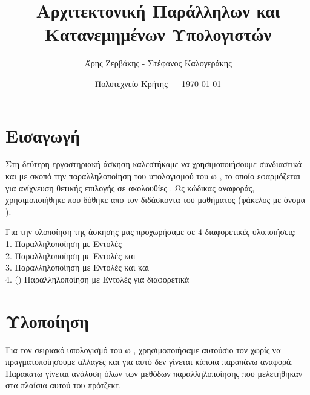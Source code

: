 \documentclass{article}
\title{Αρχιτεκτονική Παράλληλων και Κατανεμημένων Υπολογιστών} %
\author{Άρης Ζερβάκης - Στέφανος Καλογεράκης} %
\date{Πολυτεχνείο Κρήτης --- \today} %
\begin{document}
\maketitle %


\section*{Εισαγωγή} %
Στη δεύτερη εργαστηριακή άσκηση καλεστήκαμε να χρησιμοποιήσουμε συνδιαστικά  και  με σκοπό την παραλληλοποίηση του υπολογισμού του ω , το οποίο εφαρμόζεται για ανίχνευση θετικής επιλογής σε ακολουθίες . Ως κώδικας αναφοράς, χρησιμοποιήθηκε που δόθηκε απο τον διδάσκοντα του μαθήματος (φάκελος με όνομα ).\\
\begin{warn}[] %
	Για την υλοποίηση της άσκησης μας προχωρήσαμε σε 4 διαφορετικές υλοποιήσεις:\\
    1. Παραλληλοποίηση με  Εντολές\\
    2. Παραλληλοποίηση με  Εντολές και \\
    3. Παραλληλοποίηση με  Εντολές και  και \\
    4. () Παραλληλοποίηση με  Εντολές για διαφορετικά 
\end{warn}


\section{Υλοποίηση} %
Για τον σειριακό υπολογισμό του ω , χρησιμοποιήσαμε αυτούσιο τον χωρίς να πραγματοποίησουμε αλλαγές και για αυτό δεν γίνεται κάποια παραπάνω αναφορά. Παρακάτω γίνεται ανάλυση όλων των μεθόδων παραλληλοποίησης που μελετήθηκαν στα πλαίσια αυτού του πρότζεκτ.\\
\end{document}

